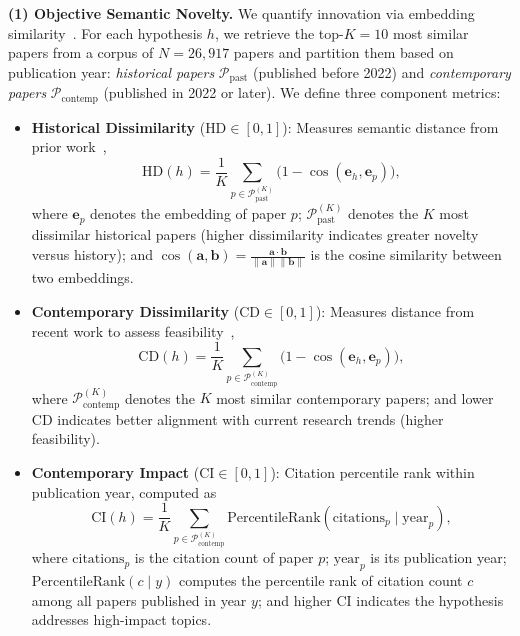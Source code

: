 \documentclass[runningheads]{llncs}
\begin{document}
\textbf{(1) Objective Semantic Novelty.} We quantify innovation via embedding similarity~\cite{shao2020bertpli,shi2023surprising}. For each hypothesis $h$, we retrieve the top-$K=10$ most similar papers from a corpus of $N=26{,}917$ papers and partition them based on publication year: \textit{historical papers} $\mathcal{P}_{\text{past}}$ (published before 2022) and \textit{contemporary papers} $\mathcal{P}_{\text{contemp}}$ (published in 2022 or later). We define three component metrics:

\begin{itemize}[leftmargin=*, itemsep=2pt]
    \item \textbf{Historical Dissimilarity} ($\text{HD} \in [0, 1]$): Measures semantic distance from prior work~\cite{shao2020bertpli},
    \begin{equation}
        \text{HD}(h) = \frac{1}{K} \sum_{p \in \mathcal{P}_{\text{past}}^{(K)}} \big(1 - \cos(\mathbf{e}_h, \mathbf{e}_p)\big),
        \label{eq:hd}
    \end{equation}
    where $\mathbf{e}_p$ denotes the embedding of paper $p$; $\mathcal{P}_{\text{past}}^{(K)}$ denotes the $K$ most dissimilar historical papers (higher dissimilarity indicates greater novelty versus history); and $\cos(\mathbf{a}, \mathbf{b}) = \frac{\mathbf{a} \cdot \mathbf{b}}{\|\mathbf{a}\| \|\mathbf{b}\|}$ is the cosine similarity between two embeddings.
    
    \item \textbf{Contemporary Dissimilarity} ($\text{CD} \in [0, 1]$): Measures distance from recent work to assess feasibility~\cite{wu2019large,fortunato2018science},
    \begin{equation}
        \text{CD}(h) = \frac{1}{K} \sum_{p \in \mathcal{P}_{\text{contemp}}^{(K)}} \big(1 - \cos(\mathbf{e}_h, \mathbf{e}_p)\big),
        \label{eq:cd}
    \end{equation}
    where $\mathcal{P}_{\text{contemp}}^{(K)}$ denotes the $K$ most similar contemporary papers; and lower CD indicates better alignment with current research trends (higher feasibility).
    
    \item \textbf{Contemporary Impact} ($\text{CI} \in [0, 1]$): Citation percentile rank within publication year, computed as~\cite{yang2022gender,alshebli2018preeminence}
    \begin{equation}
        \text{CI}(h) = \frac{1}{K} \sum_{p \in \mathcal{P}_{\text{contemp}}^{(K)}} \text{PercentileRank}(\text{citations}_p \mid \text{year}_p),
        \label{eq:ci}
    \end{equation}
    where $\text{citations}_p$ is the citation count of paper $p$; $\text{year}_p$ is its publication year; $\text{PercentileRank}(c \mid y)$ computes the percentile rank of citation count $c$ among all papers published in year $y$; and higher CI indicates the hypothesis addresses high-impact topics.
\end{itemize}
\end{document}

